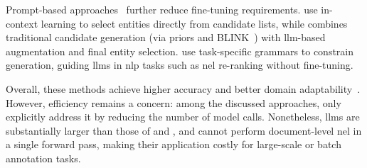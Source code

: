 Prompt-based approaches~\cite{liu-etal-2024-onenet,ding-etal-2024-chatel,geng-etal-2023-grammar} further reduce fine-tuning requirements. 
\textcite{liu-etal-2024-onenet} use in-context learning to select entities directly from candidate lists, while \textcite{ding-etal-2024-chatel} combines traditional candidate generation (via priors and BLINK~\cite{blink}) with \ac{llm}-based augmentation and final entity selection. 
\textcite{geng-etal-2023-grammar} use task-specific grammars to constrain generation, guiding \acp{llm} in \ac{nlp} tasks such as \ac{nel} re-ranking without fine-tuning. 

Overall, these methods achieve higher accuracy and better domain adaptability~\cite{liu-etal-2024-onenet,ding-etal-2024-chatel,zhou-etal-2024-gendecider,xiao-etal-2023-instructed}.
However, efficiency remains a concern: among the discussed approaches, only \textcite{xiao-etal-2023-instructed} explicitly address it by reducing the number of model calls. Nonetheless, \acp{llm} are substantially larger than those of \textcite{ayoola-etal-2022-refined} and \textcite{plekhanov2023multilingualendendentity}, and cannot perform document-level \ac{nel} in a single forward pass, making their application costly for large-scale or batch annotation tasks.








